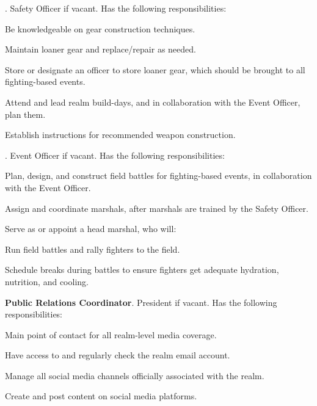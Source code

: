 \documentclass[12pt]{article}
\begin{document}
\begin{level}
\begin{level}
\begin{level}
    \end{level}
    \item {}. Safety Officer if vacant. Has the following responsibilities:
    \begin{level}
        \item Be knowledgeable on gear construction techniques.
        \item Maintain loaner gear and replace/repair as needed.
        \item Store or designate an officer to store loaner gear, which should be brought to all fighting-based events.
        \item Attend and lead realm build-days, and in collaboration with the Event Officer, plan them.
        \item Establish instructions for recommended weapon construction.
    \end{level}
    \item {}. Event Officer if vacant. Has the following responsibilities:
    \begin{level}
        \item Plan, design, and construct field battles for fighting-based events, in collaboration with the Event Officer.
        \item Assign and coordinate marshals, after marshals are trained by the Safety Officer.
        \item Serve as or appoint a head marshal, who will:
        \begin{level}
            \item Run field battles and rally fighters to the field.
            \item Schedule breaks during battles to ensure fighters get adequate hydration, nutrition, and cooling.
        \end{level}
    \end{level}
    \item \textbf{Public Relations Coordinator}. President if vacant. Has the following responsibilities:
    \begin{level}
        \item Main point of contact for all realm-level media coverage.
        \item Have access to and regularly check the realm email account.
        \item Manage all social media channels officially associated with the realm.
        \item Create and post content on social media platforms.

\end{level}
\end{level}
\end{level}
\end{document}
